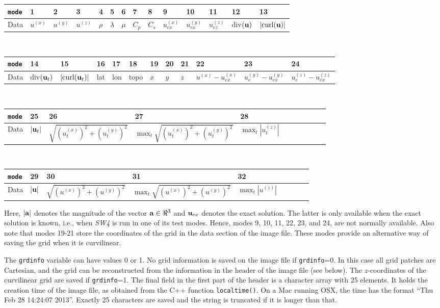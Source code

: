 \documentclass[11pt]{report}
\newcommand{\ub}{{\bf u}}
\begin{document}
\begin{flushleft}
\begin{tabular}{l||l|l|l|l|l|l|l|l|l|l|l|l|l}\hline
{\tt mode} & 1 & 2 & 3 & 4 & 5 & 6 & 7 & 8 & 9 & 10 & 11 & 12 & 13\\ \hline
Data & $u^{(x)}$ & $u^{(y)}$ & $u^{(z)}$ & $\rho$ & $\lambda$ & $\mu$ & $C_p$ & $C_s$ & $u_{ex}^{(x)}$
& $u_{ex}^{(y)}$ & $u_{ez}^{(z)}$ & div$(\ub)$ & $|\mbox{curl($\ub$)}|$ \\ \hline
\end{tabular}\\
\medskip
\begin{tabular}{l||l|l|l|l|l|l|l|l|l|l|l}\hline
{\tt mode}  & 14 & 15 & 16 & 17 & 18 & 19 & 20 & 21 & 22 & 23 & 24 \\ \hline\hline
Data & div$(\ub_t)$ & $|\mbox{curl($\ub_t$)}|$ & lat & lon &
topo & $x$ & $y$ & $z$ & $u^{(x)} - u_{ex}^{(x)}$ & $u_e^{(y)} - u_{ex}^{(y)}$ & $u_e^{(z)} -
u_{ex}^{(z)}$  \\ \hline
\end{tabular}\\
\medskip
\begin{tabular}{l||l|l|l|lllllll}\hline
{\tt mode} & 25 & 26 & 27 & 28 \\ \hline
Data & $|\ub_t|$ & $\sqrt{(u_t^{(x)})^2+(u_t^{(y)})^2}$ & $\max_t\sqrt{(u_t^{(x)})^2+(u_t^{(y)})^2}$
& $\max_t \left| u^{(z)}_t \right|$ 
\\ \hline
\end{tabular}\\
\medskip
\begin{tabular}{l||l|l|l|lllll}\hline
{\tt mode} & 29 & 30 & 31 & 32 \\ \hline
Data & $|\ub|$ & $\sqrt{(u^{(x)})^2+(u^{(y)})^2}$ & $\max_t\sqrt{(u^{(x)})^2+(u^{(y)})^2}$ & $\max_t
\left| u^{(z)} \right|$ \\ \hline 
\end{tabular}
\end{flushleft}
Here, $|\bf a|$ denotes the magnitude of the vector ${\bf a}\in\Re^3$ and $\ub_{ex}$ denotes the exact
solution. The latter is only available when the exact solution is known, i.e., when \emph{SW4} is
run in one of its test modes. Hence, modes 9, 10, 11, 22, 23, and 24, are not normally
available. Also note that modes 19-21 store the coordinates of the grid in the data section of the
image file. These modes provide an alternative way of saving the grid when it is curvilinear.

The {\tt grdinfo} variable can have values 0 or 1. No grid information is saved on the image file if
{\tt grdinfo}=0. In this case all grid patches are Cartesian, and the grid can be reconstructed from
the information in the header of the image file (see below). The $z$-coordinates of the curvilinear
grid are saved if {\tt grdinfo}=1. The final field in the first part of the header is a character
array with 25 elements. It holds the creation time of the image file, as obtained from the C++
function {\tt localtime()}. On a Mac running OSX, the time has the format ``Thu Feb 28 14:24:07
2013''. Exactly 25 characters are saved and the string is truncated if it is longer than that.
\end{document}
